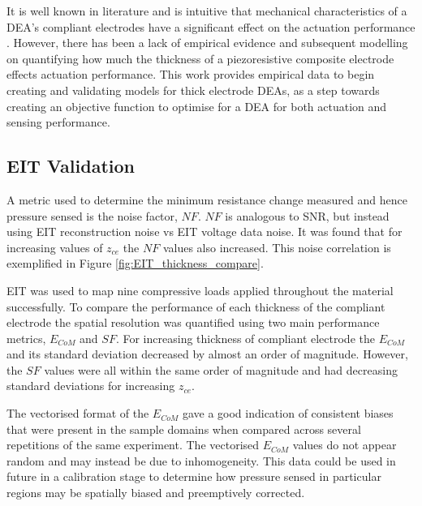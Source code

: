 It is well known in literature and is intuitive that mechanical characteristics of a DEA's compliant electrodes have a significant effect on the actuation performance \cite{Carpi2003, Zhang2020} . However, there has been a lack of empirical evidence and subsequent modelling on quantifying how much the thickness of a piezoresistive composite electrode effects actuation performance. This work provides empirical data to begin creating and validating models for thick electrode DEAs, as a step towards creating an objective function to optimise for a DEA for both actuation and sensing performance. 



\subsection{EIT Validation}
A metric used to determine the minimum resistance change measured and hence pressure sensed is the noise factor, $N\!F$. $N\!F$ is analogous to SNR, but instead using EIT reconstruction noise vs EIT voltage data noise. It was found that for increasing values of $z_{ce}$ the $N\!F$ values also increased. This noise correlation is exemplified in Figure \ref{fig:EIT_thickness_compare}.

EIT was used to map nine compressive loads applied throughout the material successfully. To compare the performance of each thickness of the compliant electrode the spatial resolution was quantified using two main performance metrics, $E_{CoM}$ and $S\!F$. For increasing thickness of compliant electrode the $E_{CoM}$ and its standard deviation decreased by almost an order of magnitude. However, the $S\!F$ values were all within the same order of magnitude and had decreasing standard deviations for increasing $z_{ce}$.

The vectorised format of the $E_{CoM}$ gave a good indication of consistent biases that were present in the sample domains when compared across several repetitions of the same experiment. The vectorised $E_{CoM}$ values do not appear random and may instead be due to inhomogeneity. This data could be used in future in a calibration stage to determine how pressure sensed in particular regions may be spatially biased and preemptively corrected.


